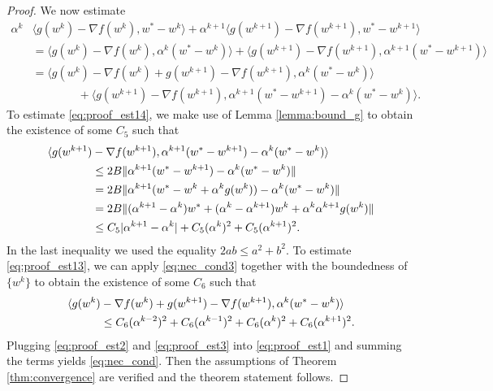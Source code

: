 \documentclass[]{interact}
\theoremstyle{plain}%
\theoremstyle{definition}
\theoremstyle{remark}
\newcommand{\norm}[1]{\|#1\|}
\newcommand{\nrm}[1]{|#1|}
\begin{document}
\begin{proof}
We now estimate
\begin{subequations}\label{eq:proof_est1}
\begin{align}
\label{eq:proof_est11} \alpha^k&\langle g(w^{k})-\nabla f(w^{k}),w^*-w^{k}\rangle + \alpha^{k+1}\langle g(w^{k+1})-\nabla f(w^{k+1}),w^*-w^{k+1}\rangle \\
\label{eq:proof_est12} &= \langle g(w^{k})-\nabla f(w^{k}),\alpha^k(w^*-w^{k})\rangle + \langle g(w^{k+1})-\nabla f(w^{k+1}),\alpha^{k+1}(w^*-w^{k+1})\rangle \\
\label{eq:proof_est13} &= \langle g(w^{k})-\nabla f(w^{k}) + g(w^{k+1})-\nabla f(w^{k+1}),\alpha^k(w^*-w^{k})\rangle \\
\label{eq:proof_est14} &\qquad\qquad + \langle g(w^{k+1})-\nabla f(w^{k+1}),\alpha^{k+1}(w^*-w^{k+1})-\alpha^k(w^*-w^{k})\rangle.
\end{align}
\end{subequations}
To estimate \eqref{eq:proof_est14}, we make use of Lemma \ref{lemma:bound_g} to obtain the existence of some $C_5$ such that
\begin{equation}\label{eq:proof_est2}
\aligned
\langle g(w^{k+1})&-\nabla f(w^{k+1}),\alpha^{k+1}(w^*-w^{k+1})-\alpha^k(w^*-w^{k})\rangle \\
&\le 2B\norm{\alpha^{k+1}(w^*-w^{k+1})-\alpha^k(w^*-w^{k})} \\
&= 2B\norm{\alpha^{k+1}(w^*-w^k+\alpha^kg(w^k))-\alpha^k(w^*-w^{k})} \\
&= 2B\norm{(\alpha^{k+1}-\alpha^k)w^* + (\alpha^k-\alpha^{k+1})w^k +\alpha^k\alpha^{k+1} g(w^k)} \\
&\le C_5 \nrm{\alpha^{k+1}-\alpha^k} + C_5(\alpha^k)^2 + C_5(\alpha^{k+1})^2.
\endaligned
\end{equation}
In the last inequality we used the equality $2ab\le a^2+b^2$. To estimate \eqref{eq:proof_est13}, we can apply \eqref{eq:nec_cond3} together with the boundedness of $\{w^k\}$ to obtain the existence of some $C_6$ such that
\begin{equation}\label{eq:proof_est3}
\aligned
\langle g(w^{k})&-\nabla f(w^{k}) + g(w^{k+1})-\nabla f(w^{k+1}),\alpha^k(w^*-w^{k})\rangle \\
&\le C_6(\alpha^{k-2})^2 + C_6(\alpha^{k-1})^2 + C_6(\alpha^{k})^2 + C_6(\alpha^{k+1})^2.
\endaligned
\end{equation}
Plugging \eqref{eq:proof_est2} and \eqref{eq:proof_est3} into \eqref{eq:proof_est1} and summing the terms yields \eqref{eq:nec_cond}. Then the assumptions of Theorem \ref{thm:convergence} are verified and the theorem statement follows.
\end{proof}
\end{document}
